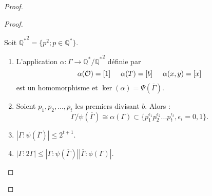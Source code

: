 \documentclass[a4paper]{article}
\begin{document}
\begin{proof}
\begin{proof}
\begin{slem}\label{prop3}
Soit $\mathbb{Q^*}^2=\{p^2 ; p \in \mathbb{Q^*}\}$.
\begin{enumerate}
\item L'application $\alpha : \Gamma \rightarrow \mathbb{Q^*}/\mathbb{Q^*}^2$ 
définie par 
\begin{equation*}
\alpha(\mathcal{O})=[1] \hspace{0.5cm}\alpha(T)=[b]\hspace{0.5cm} \alpha(x,y)=[x]
 \end{equation*}
 est un homomorphisme et $\ker(\alpha)=\Psi(\overline{\Gamma})$.
\item Soient $p_{1},p_{2},...,p_{t}$ les premiers divisant $b$. Alors :
\begin{equation*}
\Gamma /\psi(\overline{\Gamma}) \cong \alpha(\Gamma) \subset \{p_{1}^{\epsilon_{1}}
p_{2}^{\epsilon_{2}}...p_{t}^{\epsilon_{t}}, \epsilon_{i}=0,1 \}.
\end{equation*}
\item $|\Gamma : \psi(\overline{\Gamma})| \leqslant 2^{t+1}$.
\item $|\Gamma : 2\Gamma|\leqslant |\Gamma : \psi(\overline{\Gamma})| |\overline{\Gamma}:\phi(\Gamma)|$.
\end{enumerate}
\end{slem}


\end{proof}
\end{proof}
\end{document}
